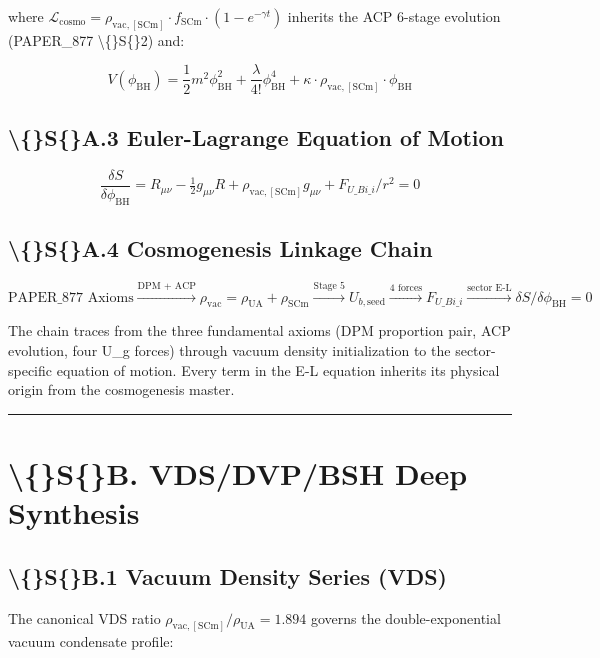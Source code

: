 \documentclass[11pt]{article}
\begin{document}
where $\mathcal{L}_{\mathrm{cosmo}} = \rho_{\mathrm{vac,[SCm]}} \cdot f_{\mathrm{SCm}} \cdot (1 - e^{-\gamma t})$ inherits the ACP 6-stage evolution (PAPER\_877 \textbackslash\{\}S\{\}2) and:

$$V(\phi_{\mathrm{BH}}) = \frac{1}{2} m^2 \phi_{\mathrm{BH}}^2 + \frac{\lambda}{4!} \phi_{\mathrm{BH}}^4 + \kappa \cdot \rho_{\mathrm{vac,[SCm]}} \cdot \phi_{\mathrm{BH}}$$

\subsection*{\textbackslash\{\}S\{\}A.3 Euler-Lagrange Equation of Motion}

$$\boxed{\frac{\delta S}{\delta \phi_{\mathrm{BH}}} = R_{\mu\nu} - \tfrac{1}{2}g_{\mu\nu}R + \rho_{\mathrm{vac,[SCm]}} g_{\mu\nu} + F_{U\_Bi\_i}/r^2 = 0}$$

\subsection*{\textbackslash\{\}S\{\}A.4 Cosmogenesis Linkage Chain}

$$\text{PAPER\_877 Axioms} \xrightarrow{\text{DPM + ACP}} \rho_{\mathrm{vac}} = \rho_{\mathrm{UA}} + \rho_{\mathrm{SCm}} \xrightarrow{\text{Stage 5}} U_{b,\mathrm{seed}} \xrightarrow{\text{4 forces}} F_{U\_Bi\_i} \xrightarrow{\text{sector E-L}} \delta S/\delta \phi_{\mathrm{BH}} = 0$$

The chain traces from the three fundamental axioms (DPM proportion pair, ACP evolution, four U\_g forces) through vacuum density initialization to the sector-specific equation of motion. Every term in the E-L equation inherits its physical origin from the cosmogenesis master.

\noindent\rule{\textwidth}{0.4pt}

\section*{\textbackslash\{\}S\{\}B. VDS/DVP/BSH Deep Synthesis}

\subsection*{\textbackslash\{\}S\{\}B.1 Vacuum Density Series (VDS)}

The canonical VDS ratio $\rho_{\mathrm{vac,[SCm]}} / \rho_{\mathrm{UA}} = 1.894$ governs the double-exponential vacuum condensate profile:
\end{document}
